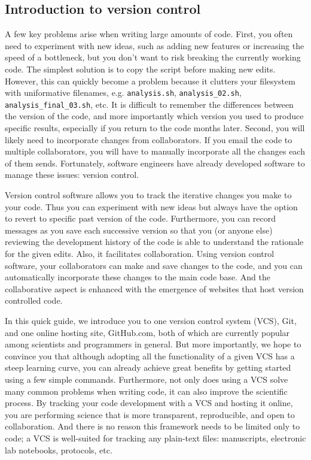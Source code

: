 \subsection{Introduction to version control}

A few key problems arise when writing large amounts of code. First, you often need to experiment with new ideas, such as adding new features or increasing the speed of a bottleneck, but you don't want to risk breaking the currently working code. The simplest solution is to copy the script before making new edits. However, this can quickly become a problem because it clutters your filesystem with uniformative filenames, e.g. \verb|analysis.sh|, \verb|analysis_02.sh|, \verb|analysis_final_03.sh|, etc. It is difficult to remember the differences between the version of the code, and more importantly which version you used to produce specific results, especially if you return to the code months later. Second, you will likely need to incorporate changes from collaborators. If you email the code to multiple collaborators, you will have to manually incorporate all the changes each of them sends. Fortunately, software engineers have already developed software to manage these issues: version control.

Version control software allows you to track the iterative changes you make to your code. Thus you can experiment with new ideas but always have the option to revert to specific past version of the code. Furthermore, you can record messages as you save each successive version so that you (or anyone else) reviewing the development history of the code is able to understand the rationale for the given edits. Also, it facilitates collaboration. Using version control software, your collaborators can make and save changes to the code, and you can automatically incorporate these changes to the main code base. And the collaborative aspect is enhanced with the emergence of websites that host version controlled code.

In this quick guide, we introduce you to one version control system (VCS), Git, and one online hosting site, GitHub.com, both of which are currently popular among scientists and programmers in general. But more importantly, we hope to convince you that although adopting all the functionality of a given VCS has a steep learning curve, you can already achieve great benefits by getting started using a few simple commands. Furthermore, not only does using a VCS solve many common problems when writing code, it can also improve the scientific process. By tracking your code development with a VCS and hosting it online, you are performing science that is more transparent, reproducible, and open to collaboration. And there is no reason this framework needs to be limited only to code; a VCS is well-suited for tracking any plain-text files: manuscripts, electronic lab notebooks, protocols, etc.
